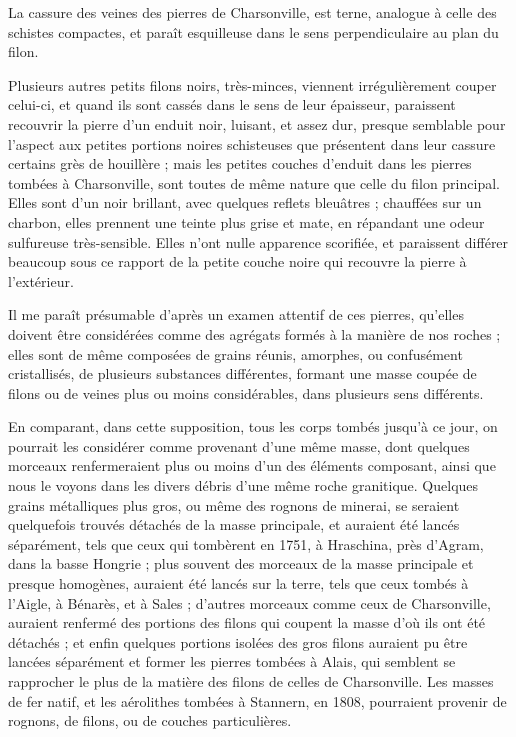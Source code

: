 \documentclass[a4paper, 12pt, oneside, french]{article}
\begin{document}
La cassure des veines des pierres de Charsonville, est terne, analogue à celle des schistes compactes, et paraît esquilleuse dans le sens perpendiculaire au plan du filon.

Plusieurs autres petits filons noirs, très-minces, viennent irrégulièrement couper celui-ci, et quand ils sont cassés dans le sens de leur épaisseur, paraissent recouvrir la pierre d'un enduit noir, luisant, et assez dur, presque semblable pour l'aspect aux petites portions noires schisteuses que présentent dans leur cassure certains grès de houillère ; mais les petites couches d'enduit dans les pierres tombées à Charsonville, sont toutes de même nature que celle du filon principal. Elles sont d'un noir brillant, avec quelques reflets bleuâtres ; chauffées sur un charbon, elles prennent une teinte plus grise et mate, en répandant une odeur sulfureuse très-sensible. Elles n'ont nulle apparence scorifiée, et paraissent différer beaucoup sous ce rapport de la petite couche noire qui recouvre la pierre à l'extérieur.

Il me paraît présumable d'après un examen attentif de ces pierres, qu'elles doivent être considérées comme des agrégats formés à la manière de nos roches ; elles sont de même composées de grains réunis, amorphes, ou confusément cristallisés, de plusieurs substances différentes, formant une masse coupée de filons ou de veines plus ou moins considérables, dans plusieurs sens différents.

En comparant, dans cette supposition, tous les corps tombés jusqu'à ce jour, on pourrait les considérer comme provenant d'une même masse, dont quelques morceaux renfermeraient plus ou moins d'un des éléments composant, ainsi que nous le voyons dans les divers débris d'une même roche granitique. Quelques grains métalliques plus gros, ou même des rognons de minerai, se seraient quelquefois trouvés détachés de la masse principale, et auraient été lancés séparément, tels que ceux qui tombèrent en 1751, à Hraschina, près d'Agram, dans la basse Hongrie ; plus souvent des morceaux de la masse principale et presque homogènes, auraient été lancés sur la terre, tels que ceux tombés à l'Aigle, à Bénarès, et à Sales ; d'autres morceaux comme ceux de Charsonville, auraient renfermé des portions des filons qui coupent la masse d'où ils ont été détachés ; et enfin quelques portions isolées des gros filons auraient pu être lancées séparément et former les pierres tombées à Alais, qui semblent se rapprocher le plus de la matière des filons de celles de Charsonville. Les masses de fer natif, et les aérolithes tombées à Stannern, en 1808, pourraient provenir de rognons, de filons, ou de couches particulières.
\end{document}
